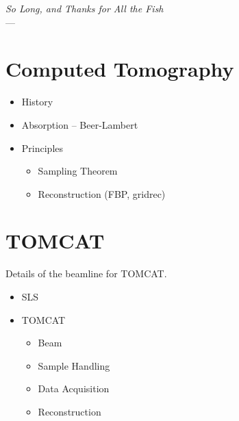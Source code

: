 \label{ch:ct}
\begin{flushright}{\slshape    
		So Long, and Thanks for All the Fish} \\ \medskip
    ---  \citep{Adams1984}
\end{flushright}
\bigskip

\section{Computed Tomography}
\begin{itemize}
    \item History
    \item Absorption -- Beer-Lambert
    \item Principles
    \begin{itemize}
        \item Sampling Theorem
        \item Reconstruction (FBP, gridrec)
    \end{itemize}
\end{itemize}

\section{TOMCAT}
Details of the beamline for \ac{TOMCAT}.

\begin{itemize}
    \item SLS
    \item TOMCAT
    \begin{itemize}
        \item Beam
        \item Sample Handling
        \item Data Acquisition
        \item Reconstruction
    \end{itemize}
\end{itemize}